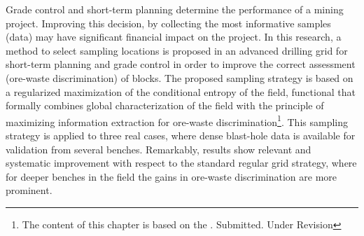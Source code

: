 Grade control and short-term planning determine the performance of a mining project. 
Improving this decision, by collecting the most informative samples (data) may have significant financial impact on the project. In this research, a method to select sampling locations is proposed in an advanced drilling grid for short-term planning and grade control in order to improve the correct assessment (ore-waste discrimination) of blocks.  %
The proposed sampling strategy is based on a regularized maximization of the conditional entropy of the field, functional that formally combines global characterization of the field with the principle of maximizing information extraction for ore-waste discrimination\footnote{The content of this chapter is based on the . Submitted. Under Revision}.
%
%
This sampling strategy is applied to three real cases, where dense blast-hole data is available for validation from several benches. %
Remarkably, results show relevant and systematic improvement with respect to the standard regular grid strategy, where for deeper benches in the field the gains in ore-waste discrimination are more prominent.





